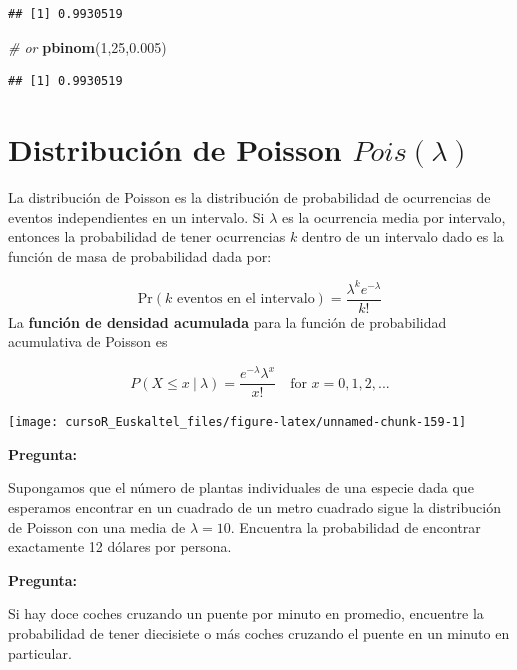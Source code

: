 \documentclass[]{book}
\newenvironment{Shaded}{\begin{snugshade}}{\end{snugshade}}
\newcommand{\KeywordTok}[1]{\textcolor[rgb]{0.13,0.29,0.53}{\textbf{#1}}}
\newcommand{\DecValTok}[1]{\textcolor[rgb]{0.00,0.00,0.81}{#1}}
\newcommand{\FloatTok}[1]{\textcolor[rgb]{0.00,0.00,0.81}{#1}}
\newcommand{\CommentTok}[1]{\textcolor[rgb]{0.56,0.35,0.01}{\textit{#1}}}
\newcommand{\NormalTok}[1]{#1}
\begin{document}
\begin{verbatim}
## [1] 0.9930519
\end{verbatim}

\begin{Shaded}
\begin{Highlighting}[]
\CommentTok{# or}
\KeywordTok{pbinom}\NormalTok{(}\DecValTok{1}\NormalTok{,}\DecValTok{25}\NormalTok{,}\FloatTok{0.005}\NormalTok{)}
\end{Highlighting}
\end{Shaded}

\begin{verbatim}
## [1] 0.9930519
\end{verbatim}

\section{\texorpdfstring{Distribución de Poisson
\(Pois(\lambda)\)}{Distribución de Poisson Pois(\textbackslash{}lambda)}}\label{distribucion-de-poisson-poislambda}

La distribución de Poisson es la distribución de probabilidad de
ocurrencias de eventos independientes en un intervalo. Si \(\lambda\) es
la ocurrencia media por intervalo, entonces la probabilidad de tener
ocurrencias \(k\) dentro de un intervalo dado es la función de masa de
probabilidad dada por:

\[
\mbox{Pr}(\mbox{$k$ eventos en el intervalo}) = \frac{\lambda^k e^{-\lambda}}{k!}
\] La \textbf{función de densidad acumulada} para la función de
probabilidad acumulativa de Poisson es

\[
P(X\leq x ~|~\lambda ) = \frac{e^{-\lambda} \lambda ^x}{x!}\quad \mbox{for $x=0,1,2,...$}
\]

\begin{center}\texttt{[image: cursoR\_Euskaltel\_files/figure-latex/unnamed-chunk-159-1]} \end{center}

\textbf{Pregunta:}

Supongamos que el número de plantas individuales de una especie dada que
esperamos encontrar en un cuadrado de un metro cuadrado sigue la
distribución de Poisson con una media de \(\lambda= 10\). Encuentra la
probabilidad de encontrar exactamente 12 dólares por persona.

\textbf{Pregunta:}

Si hay doce coches cruzando un puente por minuto en promedio, encuentre
la probabilidad de tener diecisiete o más coches cruzando el puente en
un minuto en particular.
\end{document}
